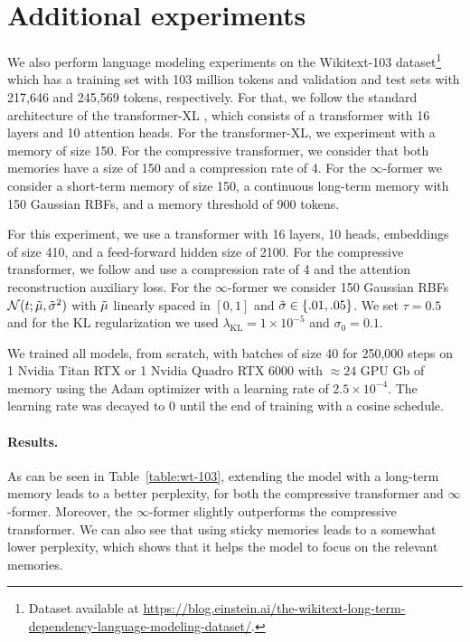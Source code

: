 \documentclass[11pt]{article}
\begin{document}
\section{Additional experiments}
\label{sec:lm}
We also perform language modeling experiments on the Wikitext-103 dataset\footnote{Dataset available at \href{https://blog.einstein.ai/the-wikitext-long-term-dependency-language-modeling-dataset/}{https://blog.einstein.ai/the-wikitext-long-term-dependency-language-modeling-dataset/}.} \citep{merity2016pointer} which has a training set with 103 million tokens and validation and test sets with  217,646 and 245,569 tokens, respectively. 
For that, we follow the standard architecture of the transformer-XL \citep{dai2019transformer}, which consists of a transformer with 16 layers and 10 attention heads. For the transformer-XL, we experiment with a memory of size 150. For the compressive transformer, we consider that both memories have a size of 150 and a compression rate of 4. 
For the \mbox{$\infty$-former} we consider a short-term memory of size 150, a continuous long-term memory with 150 Gaussian RBFs, and a memory threshold of 900 tokens. 

For this experiment, we use a transformer with 16 layers, 10 heads, embeddings of size 410, and  a feed-forward hidden size of 2100. For the compressive transformer, we follow \citet{rae2019compressive} and use a compression rate of 4 and the attention reconstruction auxiliary loss.  For the $\infty$-former we consider 150 Gaussian RBFs $\mathcal{N} (t;\Tilde{\mu},\Tilde{\sigma}^2)$ with $\Tilde{\mu}$ linearly spaced in $[0,1]$ and $\Tilde{\sigma} \in \{.01,.05\}$. 
We set $\tau=0.5$ and for the KL regularization we used $\lambda_{\mathrm{KL}} = 1 \times 10^{-5}$ and $\sigma_0 = 0.1$.

We trained all models, from scratch, with batches of size 40 for 250,000 steps on 1 Nvidia Titan RTX or 1 Nvidia Quadro RTX 6000 with $\approx 24$ GPU Gb of memory using the Adam optimizer \citep{kingma2015adam} with a learning rate of $2.5 \times 10^{-4}$. The learning rate was decayed to 0 until the end of training with a cosine schedule.

\paragraph{Results. }
As can be seen in Table~\ref{table:wt-103}, extending the model with a long-term memory leads to a better perplexity, for both the compressive transformer and  $\infty$-former. 
Moreover, the $\infty$-former slightly outperforms the compressive transformer. We can also see that using sticky memories leads to a somewhat lower perplexity, which shows that it helps the model to focus on the relevant memories.
\end{document}
